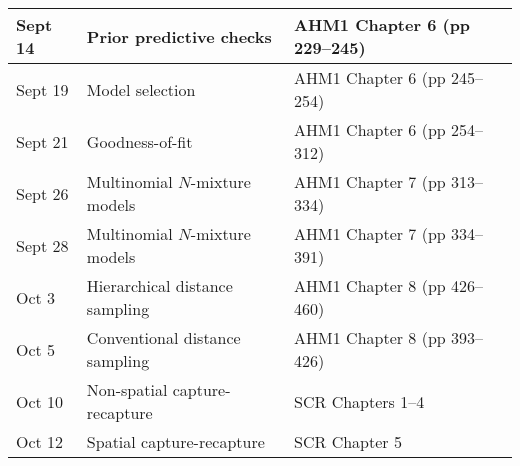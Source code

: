 \documentclass[12pt]{article}
\begin{document}
\begin{center}
\begin{tabular}[c]{lll}
Sept 14    & Prior predictive checks                      & AHM1 Chapter 6 (pp 229--245)                          \\
\hline
Sept 19    & Model selection                              & AHM1 Chapter 6 (pp 245--254)                          \\
Sept 21    & Goodness-of-fit                              & AHM1 Chapter 6 (pp 254--312)                          \\
\hline
Sept 26    & Multinomial $N$-mixture models               & AHM1 Chapter 7 (pp 313--334)                          \\
Sept 28    & Multinomial $N$-mixture models               & AHM1 Chapter 7 (pp 334--391)                          \\
\hline
Oct 3      & Hierarchical distance sampling               & AHM1 Chapter 8 (pp 426--460)                          \\
Oct 5      & Conventional distance sampling               & AHM1 Chapter 8 (pp 393--426)                          \\
\hline
Oct 10     & Non-spatial capture-recapture                & SCR Chapters 1--4                                     \\
Oct 12     & Spatial capture-recapture                    & SCR Chapter 5                                         \\

\end{tabular}
\end{center}
\end{document}
